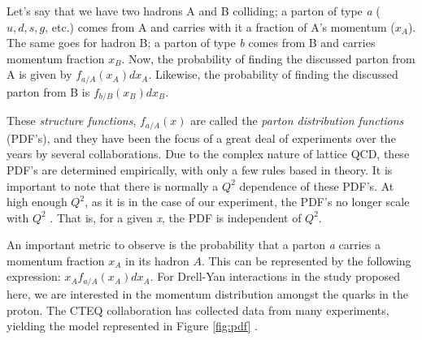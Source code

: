 \documentclass[11pt]{article}
\begin{document}
Let's say that we have two hadrons A and B colliding; a parton of type \emph{a} ($u, d, s, g$, etc.) comes from A and carries with it a fraction of A's momentum ($x_A$).  The same goes for hadron B; a parton of type \emph{b} comes from B and carries momentum fraction $x_B$. Now, the probability of finding the discussed parton from A is given by $f_{a/A}(x_A)dx_A$. Likewise, the probability of finding the discussed parton from B is $f_{b/B}(x_B)dx_B$.  

These \emph{structure functions}, $f_{a/A}(x)$ are called the \emph{parton distribution functions} (PDF's), and they have been the focus of a great deal of experiments over the years by several collaborations. Due to the complex nature of lattice QCD, these PDF's are determined empirically, with only a few rules based in theory. It is important to note that there is normally a $Q^2$ dependence of these PDF's. At high enough $Q^2$, as it is in the case of our experiment, the PDF's no longer scale with $Q^2$ \cite{Seely:2009gt}.  That is, for a given \emph{x}, the PDF is independent of $Q^2$.

An important metric to observe is the probability that a parton \emph{a} carries a momentum fraction $x_A$ in its hadron $A$.  This can be represented by the following expression: $x_A f_{a/A}(x_A)dx_A$. For Drell-Yan interactions in the study proposed here, we are interested in the momentum distribution amongst the quarks in the proton.  The CTEQ collaboration has collected data from many experiments, yielding the model represented in Figure \ref{fig:pdf} \cite{Pumplin:2002vw}.
\end{document}
